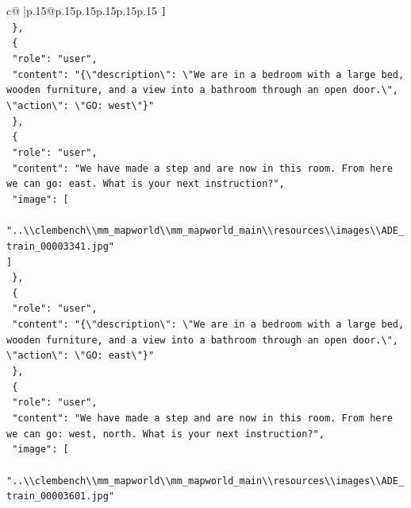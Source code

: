 \documentclass{article}
\begin{document}
{\begin{supertabular}{c@{$\;$}|p{.15\linewidth}@{}p{.15\linewidth}p{.15\linewidth}p{.15\linewidth}p{.15\linewidth}p{.15\linewidth}}
{{{\texttt{    {]}} \\
\texttt{  \},} \\
\texttt{  \{} \\
\texttt{    "role": "user",} \\
\texttt{    "content": "\{\textbackslash{}"description\textbackslash{}": \textbackslash{}"We are in a bedroom with a large bed, wooden furniture, and a view into a bathroom through an open door.\textbackslash{}", \textbackslash{}"action\textbackslash{}": \textbackslash{}"GO: west\textbackslash{}"\}"} \\
\texttt{  \},} \\
\texttt{  \{} \\
\texttt{    "role": "user",} \\
\texttt{    "content": "We have made a step and are now in this room. From here we can go: east. What is your next instruction?",} \\
\texttt{    "image": {[}} \\
\texttt{      "..\textbackslash{}\textbackslash{}clembench\textbackslash{}\textbackslash{}mm\_mapworld\textbackslash{}\textbackslash{}mm\_mapworld\_main\textbackslash{}\textbackslash{}resources\textbackslash{}\textbackslash{}images\textbackslash{}\textbackslash{}ADE\_train\_00003341.jpg"} \\
\texttt{    {]}} \\
\texttt{  \},} \\
\texttt{  \{} \\
\texttt{    "role": "user",} \\
\texttt{    "content": "\{\textbackslash{}"description\textbackslash{}": \textbackslash{}"We are in a bedroom with a large bed, wooden furniture, and a view into a bathroom through an open door.\textbackslash{}", \textbackslash{}"action\textbackslash{}": \textbackslash{}"GO: east\textbackslash{}"\}"} \\
\texttt{  \},} \\
\texttt{  \{} \\
\texttt{    "role": "user",} \\
\texttt{    "content": "We have made a step and are now in this room. From here we can go: west, north. What is your next instruction?",} \\
\texttt{    "image": {[}} \\
\texttt{      "..\textbackslash{}\textbackslash{}clembench\textbackslash{}\textbackslash{}mm\_mapworld\textbackslash{}\textbackslash{}mm\_mapworld\_main\textbackslash{}\textbackslash{}resources\textbackslash{}\textbackslash{}images\textbackslash{}\textbackslash{}ADE\_train\_00003601.jpg"} \\
}}}
\end{supertabular}}
\end{document}
